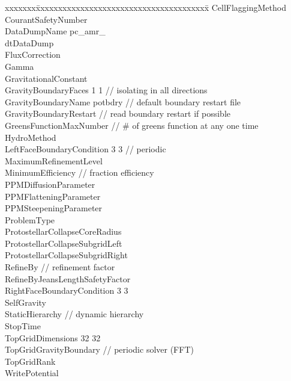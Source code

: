 \documentclass{book}
\begin{document}
{\parametersize
\begin{tabbing}
xxxxxxx\=xxxxxxxxxxxxxxxxxxxxxxxxxxxxxxxxxxxxxxx\=\kill
\> CellFlaggingMethod         \\
\> CourantSafetyNumber        \\
\> DataDumpName              \> pc\_amr\_ \\
\> dtDataDump                 \\
\> FluxCorrection             \\
\> Gamma                      \\
\> GravitationalConstant       \\
\> GravityBoundaryFaces       1 1    // isolating in all directions \\
\> GravityBoundaryName       \> potbdry  // default boundary restart file \\
\> GravityBoundaryRestart            // read boundary restart if possible \\
\> GreensFunctionMaxNumber      // \# of greens function at any one time \\
\> HydroMethod                \\
\> LeftFaceBoundaryCondition   3 3   // periodic \\
\> MaximumRefinementLevel     \\
\> MinimumEfficiency           // fraction efficiency \\
\> PPMDiffusionParameter      \\
\> PPMFlatteningParameter     \\
\> PPMSteepeningParameter     \\
\> ProblemType                 \\
\> ProtostellarCollapseCoreRadius       \\
\> ProtostellarCollapseSubgridLeft      \\
\> ProtostellarCollapseSubgridRight     \\
\> RefineBy                      // refinement factor \\
\> RefineByJeansLengthSafetyFactor  \\
\> RightFaceBoundaryCondition  3 3 \\
\> SelfGravity                 \\
\> StaticHierarchy               // dynamic hierarchy \\
\> StopTime                   \\
\> TopGridDimensions           32 32 \\
\> TopGridGravityBoundary            // periodic solver (FFT) \\
\> TopGridRank                 \\
\> WritePotential             
\end{tabbing}}
\end{document}
